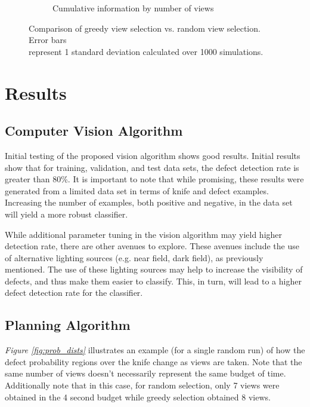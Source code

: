 \documentclass[letterpaper, 10 pt, conference]{ieeeconf}  %
\begin{document}
\begin{figure}
\begin{subfigure}[b]{.49\textwidth}
        \caption{Cumulative information by number of views}
        \vspace*{2mm}
        \label{fig:info_by_view}
    \end{subfigure}
    \caption{Comparison of greedy view selection vs. random view selection. Error bars \\ represent 1 standard deviation calculated over 1000 simulations.}
    \label{fig:info gains}
\end{figure}

\section{Results}

\subsection{Computer Vision Algorithm}

Initial testing of the proposed vision algorithm shows good results. Initial results show that for training, validation, and test data sets, the defect detection rate is greater than 80\%. It is important to note that while promising, these results were generated from a limited data set in terms of knife and defect examples. Increasing the number of examples, both positive and negative, in the data set will yield a more robust classifier.

While additional parameter tuning in the vision algorithm may yield higher detection rate, there are other avenues to explore. These avenues include the use of alternative lighting sources (e.g. near field, dark field), as previously mentioned. The use of these lighting sources may help to increase the visibility of defects, and thus make them easier to classify. This, in turn, will lead to a higher defect detection rate for the classifier.

\subsection{Planning Algorithm}

\textit{Figure \ref{fig:prob_dists}} illustrates an example (for a single random run) of how the defect probability regions over the knife change as views are taken. Note that the same number of views doesn't necessarily represent the same budget of time. Additionally note that in this case, for random selection, only 7 views were obtained in the 4 second budget while greedy selection obtained 8 views.
\end{document}
